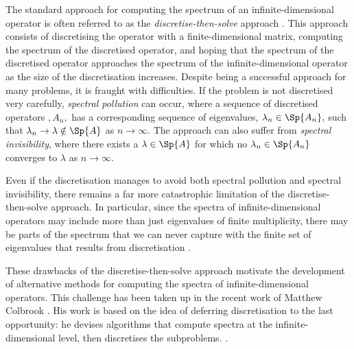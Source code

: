The standard approach for computing the spectrum of an infinite-dimensional operator is often referred to as the \textit{discretise-then-solve} approach \cite[Chapter~1]{Matt}. 
This approach consists of discretising the operator with a finite-dimensional matrix, computing the spectrum of the discretised operator, and hoping that the spectrum of the discretised operator approaches the spectrum of the infinite-dimensional operator as the size of the discretisation increases. Despite being a successful approach for many problems, it is fraught with difficulties. If the problem is not discretised very carefully, \textit{spectral pollution} can occur, where a sequence of discretised operators $,A_n,$ has a corresponding sequence of eigenvalues, $\lambda_n \in \Sp{A_n},$ such that $ \lambda_n \rightarrow \lambda \notin \Sp{A}$ as $n \rightarrow \infty.$
The approach can also suffer from \textit{spectral invisibility}, where 
there exists a $\lambda \in \Sp{A}$ for which no $\lambda_n \in \Sp{A_n}$ converges to $\lambda$ as $n \rightarrow \infty.$

Even if the discretisation manages to avoid both spectral pollution and spectral invisibility, there remains a far more catastrophic limitation of the discretise-then-solve approach. In particular, since the spectra of infinite-dimensional operators may include more than just eigenvalues of finite multiplicity, there may be parts of the spectrum that we can never capture with the finite set of eigenvalues that results from discretisation \cite{Matt}. 


These drawbacks of the discretise-then-solve approach motivate the development of alternative methods for computing the spectra of infinite-dimensional operators. This challenge has been taken up in the recent work of Matthew Colbrook \cite{Matt}. 
His work is based on the idea of deferring discretisation to the last opportunity: he devises algorithms that compute spectra at the infinite-dimensional level, then discretises the subproblems. \cite{Forward}. 


